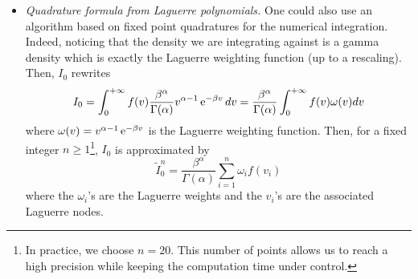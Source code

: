 \begin{itemize}[wide=0pt]
\begin{remarks}
		      In order to build the optimal quantizer, we use Lloyd's method detailed in Appendix \ref{RH:appendix:optquant} to $X \sim \Gamma(\alpha, 1)$ with the cumulative distribution function $F_{_X}( x ) = \Prob (X \leq x)$ and the partial first moment $K_{_X}( x ) = \E [X \1_{X \leq x}]$ given by
		      \begin{equation}
			      \begin{aligned}
				      \forall x > 0, \qquad       & F_{_X}( x ) = \frac{1}{\Gamma(\alpha)} \gamma(\alpha,x), \qquad & K_{_X}( x ) = \alpha F_{_X}( x ) - \frac{x^{\alpha} \e^{-x}}{\Gamma(\alpha)}, \\
				      \textrm{otherwise, } \qquad & F_{_X}( x ) = 0, \qquad                                         & K_{_X}( x ) = 0,                                                              \\
			      \end{aligned}
		      \end{equation}
		      where $\gamma(\alpha, x) = \int_{0}^{x} t^{\alpha -1} \e^{-t} dt$ is the lower gamma function. And the associated probabilities of the optimal quantizer $\widehat v_0^N$ are given by \eqref{RH:probaOptimalQuantizer}
		      \begin{equation}\label{RH:probainitialmeasure}
			      \Prob \big( \widehat v_0^N = v_{0,i}^N \big) = \Prob \big( \widehat{X}^N = x_i^N \big) = F_{_X} \big( x_{i + 1/2}^N \big) - F_{_X} \big( x_{i - 1/2}^N \big)
		      \end{equation}
		      where $\forall i \in \llbracket 2, N \rrbracket, x_{i-1/2}^N = \frac{x_{i-1}^N + x_i^N}{2}$ and $x_{1/2}^N = 0$ and $x_{N+1/2}^N = + \infty$.
	      \end{remarks}


	\item {\em Quadrature formula from Laguerre polynomials.} One could also use an algorithm based on fixed point quadratures for the numerical integration. Indeed, noticing that the density we are integrating against is a gamma density which is exactly the Laguerre weighting function (up to a rescaling). Then, $I_0$ rewrites
	      \begin{equation}
		      I_0
		      = \int_0^{+ \infty} f (v) \frac{\beta^{\alpha}}{\Gamma(\alpha)} v^{\alpha -1} \operatorname{e}^{- \beta v} dv
		      = \frac{\beta^{\alpha}}{\Gamma(\alpha)} \int_0^{+ \infty} f (v) \omega(v) dv
	      \end{equation}
	      where $\omega (v) = v^{\alpha-1} \operatorname{e}^{-\beta v}$ is the Laguerre weighting function. Then, for a fixed integer $n \geq 1$\footnote{In practice, we choose $n=20$. This number of points allows us to reach a high precision while keeping the computation time under control.}, $I_0$ is approximated by
	      \begin{equation}
		      \widetilde I_0^n = \frac{\beta^{\alpha}}{\Gamma(\alpha)} \sum_{i=1}^n \omega_i f(v_i)
	      \end{equation}
	      where the $\omega_i$'s are the Laguerre weights and the $v_i$'s are the associated Laguerre nodes.
\end{itemize}


